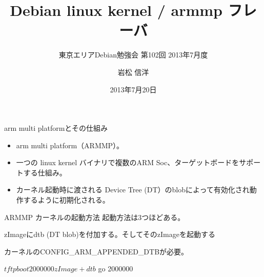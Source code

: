\title{Debian linux kernel / armmp フレーバ}
\subtitle{東京エリアDebian勉強会 第102回 2013年7月度}
\author{岩松 信洋}
\date{2013年7月20日}



\frame{\titlepage{}}

\begin{frame}{arm multi platformとその仕組み}

\begin{itemize}
\item arm multi platform（ARMMP）。
\item 一つの linux kernel バイナリで複数のARM Soc、ターゲットボードをサポートする仕組み。
\item カーネル起動時に渡される Device Tree (DT）のblobによって有効化され動作するように初期化される。
\end{itemize}

\end{frame}

\begin{frame}{ARMMP カーネルの起動方法}
起動方法は3つほどある。
\end{frame}


\begin{frame}[containsverbatim]{zImageにdtb (DT blob)を付加する。そしてそのzImageを起動する}

カーネルのCONFIG\_ARM\_APPENDED\_DTBが必要。
\begin{commandline}
$ tftpboot 2000000 zImage+dtb
$ go 2000000 
\end{commandline}
\end{frame}

